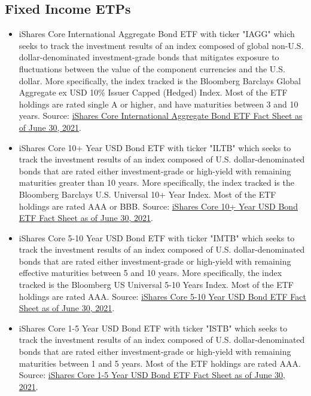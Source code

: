 \subsection*{Fixed Income ETPs}
    \begin{itemize}
        \item iShares Core International Aggregate Bond ETF with ticker "IAGG" which seeks to track the investment results of an index composed of global non-U.S. dollar-denominated investment-grade bonds that mitigates exposure to fluctuations between the value of the component currencies and the U.S. dollar. More specifically, the index tracked is the Bloomberg Barclays Global Aggregate ex USD 10\% Issuer Capped (Hedged) Index. Most of the ETF holdings are rated single A or higher, and have maturities between 3 and 10 years. Source: \href{https://www.ishares.com/us/literature/fact-sheet/iagg-ishares-core-international-aggregate-bond-etf-fund-fact-sheet-en-us.pdf}{iShares Core International Aggregate Bond ETF Fact Sheet as of June 30, 2021}.%
        
        \item iShares Core 10+ Year USD Bond ETF with ticker "ILTB" which seeks to track the investment results of an index composed of U.S. dollar-denominated bonds that are rated either investment-grade or high-yield with remaining maturities greater than 10 years. More specifically, the index tracked is the Bloomberg Barclays U.S. Universal 10+ Year Index. Most of the ETF holdings are rated AAA or BBB. Source: \href{https://www.ishares.com/us/literature/fact-sheet/iltb-ishares-core-10-year-usd-bond-etf-fund-fact-sheet-en-us.pdf}{iShares Core 10+ Year USD Bond ETF Fact Sheet as of June 30, 2021}.%
        
        \item iShares Core 5-10 Year USD Bond ETF with ticker "IMTB" which seeks to track the investment results of an index composed of U.S. dollar-denominated bonds that are rated either investment-grade or high-yield with remaining effective maturities between 5 and 10 years. More specifically, the index tracked is the Bloomberg US Universal 5-10 Years Index. Most of the ETF holdings are rated AAA. Source: \href{https://www.ishares.com/us/literature/fact-sheet/imtb-ishares-core-5-10-year-usd-bond-etf-fund-fact-sheet-en-us.pdf}{iShares Core 5-10 Year USD Bond ETF Fact Sheet as of June 30, 2021}.%
        
        \item iShares Core 1-5 Year USD Bond ETF with ticker "ISTB" which seeks to track the investment results of an index composed of U.S. dollar-denominated bonds that are rated either investment-grade or high-yield with remaining maturities between 1 and 5 years. Most of the ETF holdings are rated AAA. Source: \href{https://www.ishares.com/us/literature/fact-sheet/istb-ishares-core-1-5-year-usd-bond-etf-fund-fact-sheet-en-us.pdf}{iShares Core 1-5 Year USD Bond ETF Fact Sheet as of June 30, 2021}.%
    \end{itemize}
